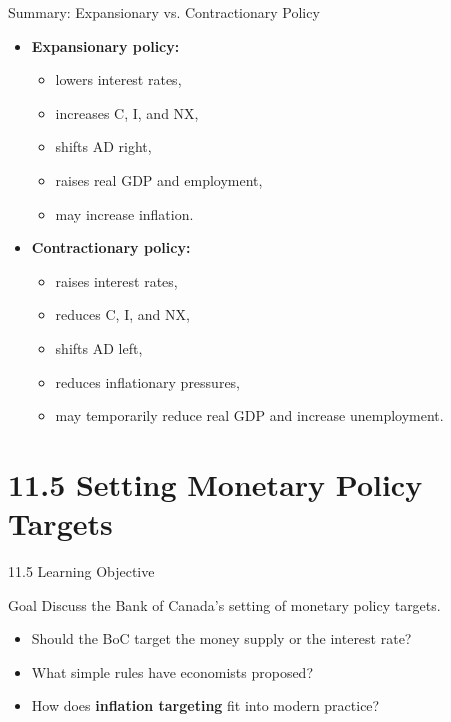 \documentclass[aspectratio=169]{beamer}
\begin{document}
\begin{frame}{Summary: Expansionary vs. Contractionary Policy}
\transfade
\begin{itemize}
  \item \textbf{Expansionary policy:}
  \begin{itemize}
    \item lowers interest rates,
    \item increases C, I, and NX,
    \item shifts AD right,
    \item raises real GDP and employment,
    \item may increase inflation.
  \end{itemize}
  \item \textbf{Contractionary policy:}
  \begin{itemize}
    \item raises interest rates,
    \item reduces C, I, and NX,
    \item shifts AD left,
    \item reduces inflationary pressures,
    \item may temporarily reduce real GDP and increase unemployment.
  \end{itemize}
\end{itemize}
\end{frame}

\section{11.5 Setting Monetary Policy Targets}

\begin{frame}{11.5 Learning Objective}
\transfade
\begin{block}{Goal}
Discuss the Bank of Canada’s setting of monetary policy targets.
\end{block}
\begin{itemize}
  \item Should the BoC target the money supply or the interest rate?
  \item What simple rules have economists proposed?
  \item How does \textbf{inflation targeting} fit into modern practice?
\end{itemize}
\end{frame}
\end{document}
